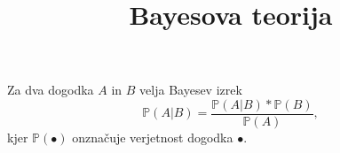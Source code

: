 \documentclass[a4paper,12pt]{article}
\begin{document}
\title{Bayesova teorija}
\maketitle  

Za dva dogodka $A$ in $B$ velja Bayesev izrek
\[\mathbb{P}(A \lvert B) = \frac{\mathbb{P}(A \lvert B) * \mathbb{P}(B)}{\mathbb{P}(A)},\]
kjer $\mathbb{P}(\bullet)$ onznačuje verjetnost dogodka $\bullet$. 
\end{document}
